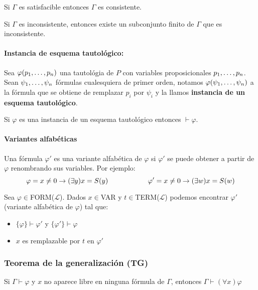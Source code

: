 \begin{teorema}
	Si $\Gamma$ es satisfacible entonces $\Gamma$ es consistente.
\end{teorema}

\begin{teorema}
	Si $\Gamma$ es inconsistente, entonces existe un subconjunto finito de $\Gamma$ que es inconsistente.
\end{teorema}

\paragraph{Instancia de esquema tautológico:} Sea $\varphi(p_1,\dots, p_{n})$ una tautológia de $P$ con variables proposicionales $p_1,\dots, p_{n}$. Sean $\psi_1,\dots, \psi_{n}$ fórmulas cualesquiera de primer orden, notamos $\varphi(\psi_1,\dots, \psi_{n})$ a la fórmula que se obtiene de remplazar $p_i$ por $\psi_i$ y la llamos \textbf{instancia de un esquema tautológico}.

\begin{proposicion}
	Si $\varphi$ es una instancia de un esquema tautológico entonces $\vdash\varphi$.
\end{proposicion}

\paragraph{Variantes alfabéticas} Una fórmula $\varphi'$ es una variante alfabética de $\varphi$ si $\varphi'$ se puede obtener a partir de $\varphi$ renombrando sus variables. Por ejemplo:
$$\varphi = x\neq 0\to(\exists y) x = S(y) \hspace*{2cm}\varphi'=x\neq 0\to(\exists w) x = S(w)$$

\begin{lema}
	Sea $\varphi\in$FORM($\mathcal{L}$). Dados $x\in$VAR y $t\in$TERM($\mathcal{L}$) podemos encontrar $\varphi'$ (variante alfabética de $\varphi$) tal que:
	\begin{itemize}
		\item $\{\varphi\}\vdash\varphi'$ y $\{\varphi'\}\vdash\varphi$
	\item $x$ es remplazable por $t$ en $\varphi'$
	\end{itemize}
\end{lema}

\subsubsection{Teorema de la generalización (TG)}
\begin{teorema}
	Si $\Gamma\vdash\varphi$ y $x$ no aparece libre en ninguna fórmula de $\Gamma$, entonces $\Gamma\vdash(\forall x)\varphi$
\end{teorema}

